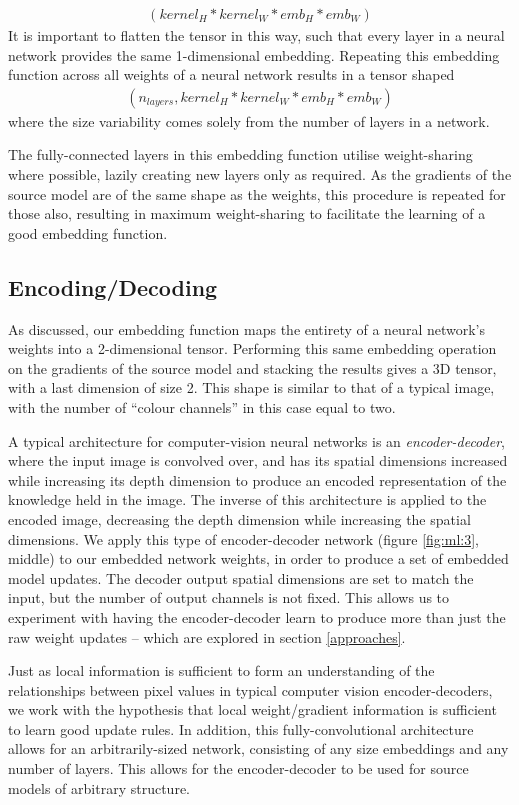 \documentclass{report}
\begin{document}
\begin{align}
(kernel_{H}*kernel_{W}*emb_H*emb_W)
\end{align}
It is important to flatten the tensor in this way, such that every layer in a neural network provides the same 1-dimensional embedding. Repeating this embedding function across all weights of a neural network results in a tensor shaped 
\begin{align}
(n_{layers}, kernel_{H}*kernel_{W}*emb_H*emb_W)
\end{align}
where the size variability comes solely from the number of layers in a network. \par
The fully-connected layers in this embedding function utilise weight-sharing where possible, lazily creating new layers only as required. As the gradients of the source model are of the same shape as the weights, this procedure is repeated for those also, resulting in maximum weight-sharing to facilitate the learning of a good embedding function. \par

\subsection{Encoding/Decoding}
As discussed, our embedding function maps the entirety of a neural network's weights into a 2-dimensional tensor. Performing this same embedding operation on the gradients of the source model and stacking the results gives a 3D tensor, with a last dimension of size 2. This shape is similar to that of a typical image, with the number of ``colour channels'' in this case equal to two. \par
A typical architecture for computer-vision neural networks is an \textit{encoder-decoder}, where the input image is convolved over, and has its spatial dimensions increased while increasing its depth dimension to produce an encoded representation of the knowledge held in the image. The inverse of this architecture is applied to the encoded image, decreasing the depth dimension while increasing the spatial dimensions. We apply this type of encoder-decoder network (figure \ref{fig:ml:3}, middle) to our embedded network weights, in order to produce a set of embedded model updates. The decoder output spatial dimensions are set to match the input, but the number of output channels is not fixed. This allows us to experiment with having the encoder-decoder learn to produce more than just the raw weight updates -- which are explored in section \ref{approaches}. \par
Just as local information is sufficient to form an understanding of the relationships between pixel values in typical computer vision encoder-decoders, we work with the hypothesis that local weight/gradient information is sufficient to learn good update rules. In addition, this fully-convolutional architecture allows for an arbitrarily-sized network, consisting of any size embeddings and any number of layers. This allows for the encoder-decoder to be used for source models of arbitrary structure. \par
\end{document}
